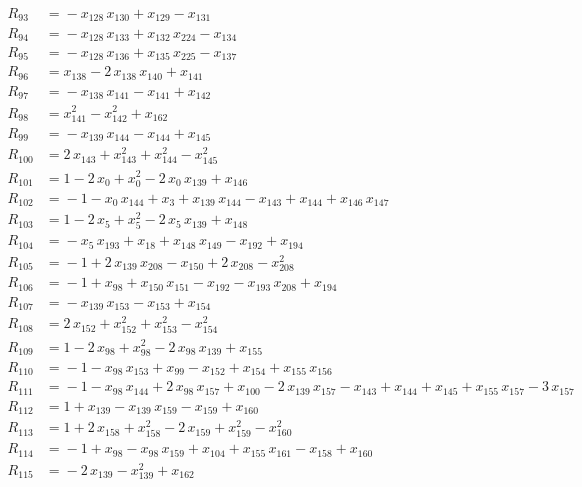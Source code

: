 \begin{align*}
R_{93} &={} -x_{128}\,x_{130} +x_{129} -x_{131} \\[3pt]
R_{94} &={} -x_{128}\,x_{133} +x_{132}\,x_{224} -x_{134} \\[3pt]
R_{95} &={} -x_{128}\,x_{136} +x_{135}\,x_{225} -x_{137} \\[3pt]
R_{96} &={} x_{138} -2\,x_{138}\,x_{140} +x_{141} \\[3pt]
R_{97} &={} -x_{138}\,x_{141} -x_{141} +x_{142} \\[3pt]
R_{98} &={} x_{141}^{2} -x_{142}^{2} +x_{162} \\[3pt]
R_{99} &={} -x_{139}\,x_{144} -x_{144} +x_{145} \\[3pt]
R_{100} &={} 2\,x_{143} +x_{143}^{2} +x_{144}^{2} -x_{145}^{2} \\[3pt]
R_{101} &={} 1 -2\,x_{0} +x_{0}^{2} -2\,x_{0}\,x_{139} +x_{146} \\[3pt]
R_{102} &={} -1 -x_{0}\,x_{144} +x_{3} +x_{139}\,x_{144} -x_{143} +x_{144} +x_{146}\,x_{147} \\[3pt]
R_{103} &={} 1 -2\,x_{5} +x_{5}^{2} -2\,x_{5}\,x_{139} +x_{148} \\[3pt]
R_{104} &={} -x_{5}\,x_{193} +x_{18} +x_{148}\,x_{149} -x_{192} +x_{194} \\[3pt]
R_{105} &={} -1 +2\,x_{139}\,x_{208} -x_{150} +2\,x_{208} -x_{208}^{2} \\[3pt]
R_{106} &={} -1 +x_{98} +x_{150}\,x_{151} -x_{192} -x_{193}\,x_{208} +x_{194} \\[3pt]
R_{107} &={} -x_{139}\,x_{153} -x_{153} +x_{154} \\[3pt]
R_{108} &={} 2\,x_{152} +x_{152}^{2} +x_{153}^{2} -x_{154}^{2} \\[3pt]
R_{109} &={} 1 -2\,x_{98} +x_{98}^{2} -2\,x_{98}\,x_{139} +x_{155} \\[3pt]
R_{110} &={} -1 -x_{98}\,x_{153} +x_{99} -x_{152} +x_{154} +x_{155}\,x_{156} \\[3pt]
R_{111} &={} -1 -x_{98}\,x_{144} +2\,x_{98}\,x_{157} +x_{100} -2\,x_{139}\,x_{157} -x_{143} +x_{144} +x_{145} +x_{155}\,x_{157} -3\,x_{157} \\[3pt]
R_{112} &={} 1 +x_{139} -x_{139}\,x_{159} -x_{159} +x_{160} \\[3pt]
R_{113} &={} 1 +2\,x_{158} +x_{158}^{2} -2\,x_{159} +x_{159}^{2} -x_{160}^{2} \\[3pt]
R_{114} &={} -1 +x_{98} -x_{98}\,x_{159} +x_{104} +x_{155}\,x_{161} -x_{158} +x_{160} \\[3pt]
R_{115} &={} -2\,x_{139} -x_{139}^{2} +x_{162} \\[3pt]

\end{align*}
